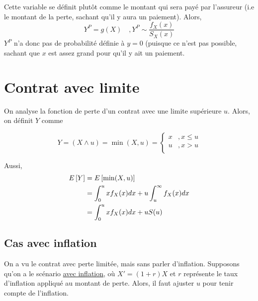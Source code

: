 \documentclass[12pt, french]{report}
\begin{document}
\begin{definition}
Cette variable se définit plutôt comme le montant qui sera payé par l'assureur (i.e le montant de la perte, sachant qu'il y aura un paiement). Alors,
\begin{equation}
Y^P = g(X) \quad , Y^P \sim \frac{f_X(x)}{S_X(x)}
\end{equation}
$Y^P$ n'a donc pas de probabilité définie à $y=0$ (puisque ce n'est pas possible, sachant que $x$ est assez grand pour qu'il y ait un paiement.
\end{definition}



\section{Contrat avec limite}
\label{sec:limite-sans-inflation}
On analyse la fonction de perte d'un contrat avec une limite supérieure $u$. Alors, on définit $Y$ comme


\begin{equation}
Y	 = (X \wedge u) = \min(X, u) = \begin{cases}
x	& , x \leq u \\
u	& , x > u \\
\end{cases}
\end{equation}

Aussi,
\begin{align*}
E \left[ Y \right]	& = E \left[ \min(X,u) \right] \\
	& = \int_{0}^{u} x f_X(x) dx + u \int_{u}^{\infty} f_X(x) dx \\
	& = \int_{0}^{u} x f_X(x) dx + u S(u) \\
\end{align*}



\subsection{Cas avec inflation}
On a vu le contrat avec perte limitée, mais sans parler d'inflation. Supposons qu'on a le scénario \underline{avec inflation}, où $X' = (1+r)X$ et $r$ représente le taux d'inflation appliqué au montant de perte. Alors, il faut ajuster $u$ pour tenir compte de l'inflation.
\end{document}
